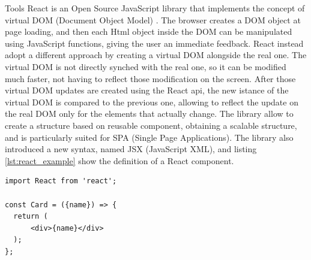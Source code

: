 \begin{chapter}{Tools}
    React is an Open Source JavaScript library that implements the concept of
    virtual DOM (Document Object Model) \cite{dom_standard}. The browser creates
    a DOM object at page loading, and then each Html object inside the DOM can be
    manipulated using JavaScript functions, giving the user an immediate feedback.
    React instead adopt a different approach by creating a virtual DOM alongside
    the real one. The virtual DOM is not directly synched with the real one, so
    it can be modified much faster, not having to reflect those modification on
    the screen. After those virtual DOM updates are created using the React api,
    the new istance of the virtual DOM is compared to the previous one, allowing
    to reflect the update on the real DOM only for the elements that actually
    change. The library allow to create a structure based on reusable component,
    obtaining a scalable structure, and is particularly suited for SPA (Single
    Page Applications).
    The library also introduced a new syntax, named JSX (JavaScript XML), and
    listing \ref{lst:react_example} show the definition of a React component.

    \bigskip
    \begin{lstlisting}[caption= React component definition,label={lst:react_example}]
import React from 'react';

const Card = ({name}) => {
  return (
      <div>{name}</div>
  );
};
    \end{lstlisting}


    \cite{react_js}

\end{chapter}